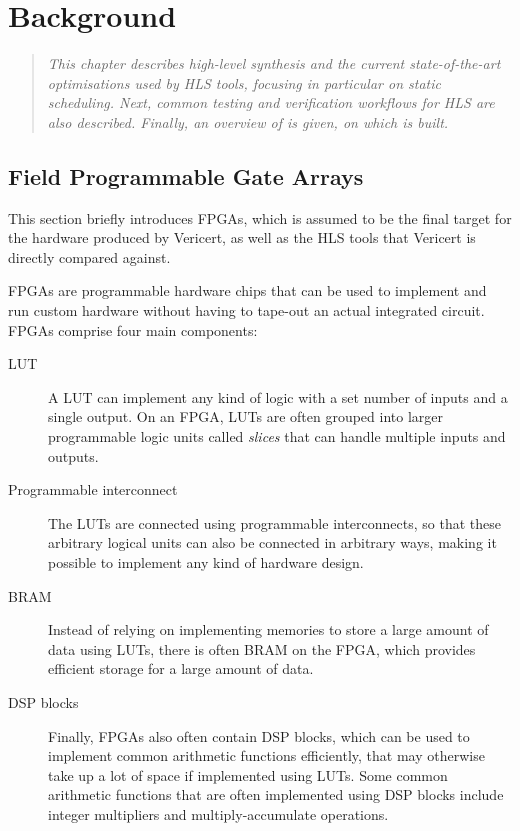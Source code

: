 \chapter{Background}%
\label{sec:background}

\begin{quote}\itshape
  This chapter describes high-level synthesis and the current state-of-the-art
  optimisations used by \gls{HLS} tools, focusing in particular on static
  scheduling.  Next, common testing and verification workflows for \gls{HLS} are
  also described.  Finally, an overview of \compcert{} is given, on which
  \vericert{} is built.
\end{quote}

\section{Field Programmable Gate Arrays}%
\label{sec:bg:fpga}

This section briefly introduces \glspl{FPGA}, which is assumed to be the
final target for the hardware produced by Vericert, as well as the \gls{HLS}
tools that Vericert is directly compared against.

\Glspl{FPGA} are programmable hardware chips that can be used to implement and
run custom hardware without having to tape-out an actual integrated circuit.
\glspl{FPGA} comprise four main components:

\begin{description}
\item[\gls{LUT}] A \gls{LUT} can implement any kind of logic with a set number
  of inputs and a single output.  On an \gls{FPGA}, \glspl{LUT} are often
  grouped into larger programmable logic units called \emph{slices} that can
  handle multiple inputs and outputs.
\item[Programmable interconnect] The \glspl{LUT} are connected using
  programmable interconnects, so that these arbitrary logical units can also be
  connected in arbitrary ways, making it possible to implement any kind of
  hardware design.
\item[\gls{BRAM}] Instead of relying on implementing memories to store a large
  amount of data using \glspl{LUT}, there is often \gls{BRAM} on the \gls{FPGA},
  which provides efficient storage for a large amount of data.
\item[\gls{DSP} blocks] Finally, \glspl{FPGA} also often contain \gls{DSP}
  blocks, which can be used to implement common arithmetic functions
  efficiently, that may otherwise take up a lot of space if implemented using
  \glspl{LUT}.  Some common arithmetic functions that are often implemented
  using \gls{DSP} blocks include integer multipliers and multiply-accumulate
  operations.
\end{description}

